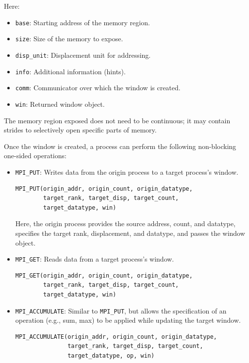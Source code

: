 \documentclass[12pt]{book}
\begin{document}
Here:
\begin{itemize}
    \item \texttt{base}: Starting address of the memory region.
    \item \texttt{size}: Size of the memory to expose.
    \item \texttt{disp\_unit}: Displacement unit for addressing.
    \item \texttt{info}: Additional information (hints).
    \item \texttt{comm}: Communicator over which the window is created.
    \item \texttt{win}: Returned window object.
\end{itemize}

The memory region exposed does not need to be continuous; it may contain strides to selectively open specific parts of memory.

Once the window is created, a process can perform the following non-blocking one-sided operations:

\begin{itemize}
    \item \texttt{MPI\_PUT}: Writes data from the origin process to a target process's window.
    \begin{lstlisting}[style=cppstyle]
MPI_PUT(origin_addr, origin_count, origin_datatype,
        target_rank, target_disp, target_count,
        target_datatype, win)
    \end{lstlisting}
    Here, the origin process provides the source address, count, and datatype, specifies the target rank, displacement, and datatype, and passes the window object.

    \item \texttt{MPI\_GET}: Reads data from a target process's window.
    \begin{lstlisting}[style=cppstyle]
MPI_GET(origin_addr, origin_count, origin_datatype,
        target_rank, target_disp, target_count,
        target_datatype, win)
    \end{lstlisting}

    \item \texttt{MPI\_ACCUMULATE}: Similar to \texttt{MPI\_PUT}, but allows the specification of an operation (e.g., sum, max) to be applied while updating the target window.
    \begin{lstlisting}[style=cppstyle]
MPI_ACCUMULATE(origin_addr, origin_count, origin_datatype,
               target_rank, target_disp, target_count,
               target_datatype, op, win)
    \end{lstlisting}
\end{itemize}
\end{document}
